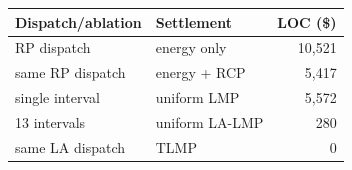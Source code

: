\begin{tabular}{llr}
\toprule
Dispatch/ablation & Settlement & LOC (\$) \\
\midrule
RP dispatch & energy only & 10,521 \\
same RP dispatch & energy + RCP & 5,417 \\
single interval & uniform LMP & 5,572 \\
13 intervals & uniform LA-LMP & 280 \\
same LA dispatch & TLMP & 0 \\
\bottomrule
\end{tabular}
